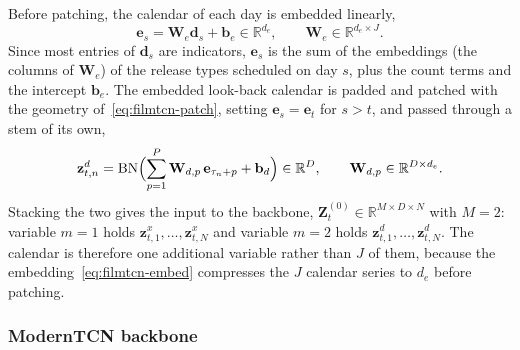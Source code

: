Before patching, the calendar of each day is embedded linearly,
\begin{equation}
  \mathbf{e}_s = \mathbf{W}_e\mathbf{d}_s + \mathbf{b}_e \in \mathbb{R}^{d_e},
  \qquad \mathbf{W}_e \in \mathbb{R}^{d_e\times J}.
  \label{eq:filmtcn-embed}
\end{equation}
Since most entries of $\mathbf{d}_s$ are indicators, $\mathbf{e}_s$ is the sum
of the embeddings (the columns of $\mathbf{W}_e$) of the release types scheduled
on day $s$, plus the count terms and the intercept $\mathbf{b}_e$. The embedded
look-back calendar is padded and patched with the geometry
of~\eqref{eq:filmtcn-patch}, setting $\mathbf{e}_s = \mathbf{e}_t$ for $s>t$,
and passed through a stem of its own,
\begin{equation}
  \mathbf{z}^{d}_{t,n}
  = \operatorname{BN}\Bigl(\sum_{p=1}^{P}\mathbf{W}_{d,p}\,\mathbf{e}_{\tau_n+p}
    + \mathbf{b}_d\Bigr) \in \mathbb{R}^{D},
  \qquad \mathbf{W}_{d,p} \in \mathbb{R}^{D\times d_e}.
  \label{eq:filmtcn-stem-d}
\end{equation}
Stacking the two gives the input to the backbone,
$\mathbf{Z}^{(0)}_t \in \mathbb{R}^{M\times D\times N}$ with $M=2$: variable
$m=1$ holds $\mathbf{z}^{x}_{t,1},\dots,\mathbf{z}^{x}_{t,N}$ and variable $m=2$
holds $\mathbf{z}^{d}_{t,1},\dots,\mathbf{z}^{d}_{t,N}$. The calendar is
therefore one additional variable rather than $J$ of them, because the
embedding~\eqref{eq:filmtcn-embed} compresses the $J$ calendar series to $d_e$
before patching.

\subsubsection{ModernTCN backbone}
\label{sec:filmtcn-backbone}

